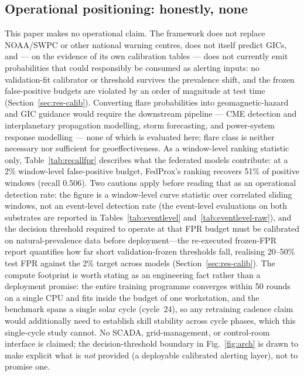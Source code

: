 \subsection{Operational positioning: honestly, none}

This paper makes no operational claim. The framework does not replace
NOAA/SWPC or other national warning centres, does not itself predict
GICs, and --- on the evidence of its own calibration tables --- does
not currently emit probabilities that could responsibly be consumed as
alerting inputs: no validation-fit calibrator or threshold survives
the prevalence shift, and the frozen false-positive budgets are
violated by an order of magnitude at test time
(Section~\ref{sec:res-calib}). Converting flare probabilities into
geomagnetic-hazard and GIC guidance would require the downstream
pipeline --- CME detection and interplanetary propagation modelling,
storm forecasting, and power-system response modelling --- none of
which is evaluated here; flare class is neither necessary nor
sufficient for geoeffectiveness. As a window-level ranking statistic
only, Table~\ref{tab:recallfpr} describes what the federated models
contribute: at a 2\% window-level false-positive budget, FedProx's
ranking recovers 51\% of positive windows (recall 0.506). Two cautions apply before reading that as an
operational detection rate: the figure is a window-level curve
statistic over correlated sliding windows, not an event-level
detection rate (the event-level evaluations on both substrates are
reported in Tables~\ref{tab:eventlevel} and~\ref{tab:eventlevel-raw}), and the decision threshold required to operate at that FPR
budget must be calibrated on natural-prevalence data before
deployment---the re-executed frozen-FPR report quantifies how far
short validation-frozen thresholds fall, realising 20--50\% test FPR
against the 2\% target across models
(Section~\ref{sec:res-calib}). The compute footprint is worth stating as an engineering fact rather
than a deployment promise: the entire training programme converges
within 50 rounds on a single CPU and fits inside the budget of one
workstation, and the benchmark spans a single solar cycle (cycle~24),
so any retraining cadence claim would additionally need to establish
skill stability across cycle phases, which this single-cycle study
cannot. No SCADA, grid-management, or control-room interface is
claimed; the decision-threshold boundary in Fig.~\ref{fig:arch} is
drawn to make explicit what is \emph{not} provided (a deployable
calibrated alerting layer), not to promise one.

